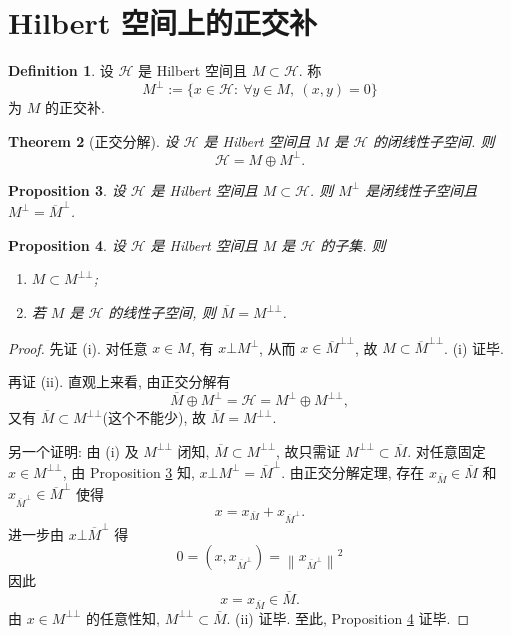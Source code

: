 \documentclass[a4paper,11pt]{article}
\newtheorem{theorem}{Theorem}[section]
\newtheorem{proposition}[theorem]{Proposition}
\theoremstyle{definition}
\newtheorem{definition}[theorem]{Definition}
\begin{document}
\section{Hilbert 空间上的正交补}

\begin{definition}
    设 $ \mathcal{H} $ 是 Hilbert 空间且 $ M \subset \mathcal{H} $. 称
    $$
        M^\bot := \{ x \in \mathcal{H} :\ \forall y \in M,\ (x, y) = 0 \}
    $$
    为 $ M $ 的正交补.
\end{definition}

\begin{theorem}[正交分解]
    设 $ \mathcal{H} $ 是 Hilbert 空间且 $ M $ 是 $ \mathcal{H} $ 的闭线性子空间. 则
    $$
        \mathcal{H} = M \oplus M^\bot.
    $$
\end{theorem}

\begin{proposition} \label{1}
    设 $ \mathcal{H} $ 是 Hilbert 空间且 $ M \subset \mathcal{H} $. 
    则 $ M^\bot $ 是闭线性子空间且 $ M^\bot = \overline{M}^\bot $.
\end{proposition}

\begin{proposition} \label{2}
    设 $ \mathcal{H} $ 是 Hilbert 空间且 $ M $ 是 $ \mathcal{H} $ 的子集. 则
    \begin{enumerate}[{\rm(i)}]
        \item $ M \subset M^{\bot \bot} $;
        \item 若 $ M $ 是 $ \mathcal{H} $ 的线性子空间, 则 $ \overline{M} = M^{\bot \bot} $.
    \end{enumerate}
\end{proposition}

\begin{proof}
    先证 (i). 对任意 $ x \in M $, 有 
    $ x \bot M^\bot $, 从而 $ x \in \overline{M}^{\bot \bot} $,
    故 $ M \subset \overline{M}^{\bot \bot} $. (i) 证毕.
    
    再证 (ii). 直观上来看, 由正交分解有
    $$
        \overline{M} \oplus M^\bot = \mathcal{H} = M^\bot \oplus M^{\bot \bot},
    $$
    又有 $ \overline{M} \subset M^{\bot \bot} $(这个不能少), 故 $ \overline{M} = M^{\bot \bot} $.
    
    另一个证明: 由 (i) 及 $ M^{\bot \bot} $ 闭知, $ \overline{M} \subset M^{\bot \bot} $,
    故只需证 $ M^{\bot \bot} \subset \overline{M} $. 
    对任意固定 $ x \in M^{\bot \bot} $,
    由 Proposition \ref{1} 知, $ x \bot M^\bot = \overline{M}^\bot $. 由正交分解定理,
    存在 $ x_{\overline{M}} \in \overline{M} $ 和 $ x_{\overline{M}^\bot} \in \overline{M}^\bot $ 
    使得 
    $$ 
        x = x_{\overline{M}} + x_{\overline{M}^\bot}. 
    $$
    进一步由 $ x \bot \overline{M}^\bot $ 得
    $$
        0 = \left( x, x_{\overline{M}^\bot} \right)  = \left\|  x_{\overline{M}^\bot} \right\|^2
    $$
    因此
    $$
        x = x_{\overline{M}} \in \overline{M}.
    $$
    由 $ x \in M^{\bot \bot} $ 的任意性知, $ M^{\bot \bot} \subset \overline{M} $. (ii) 证毕.
    至此, Proposition \ref{2} 证毕.
\end{proof}
\end{document}
